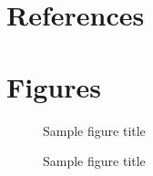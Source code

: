 \documentclass{bmcart}
\begin{document}
\begin{backmatter}
		\section*{References}
		
		
		
		
		\section*{Figures}
		\begin{figure}[h!]
			\caption{Sample figure title}
		\end{figure}
		
		\begin{figure}[h!]
			\caption{Sample figure title}
		\end{figure}
		
		

\end{backmatter}
\end{document}
